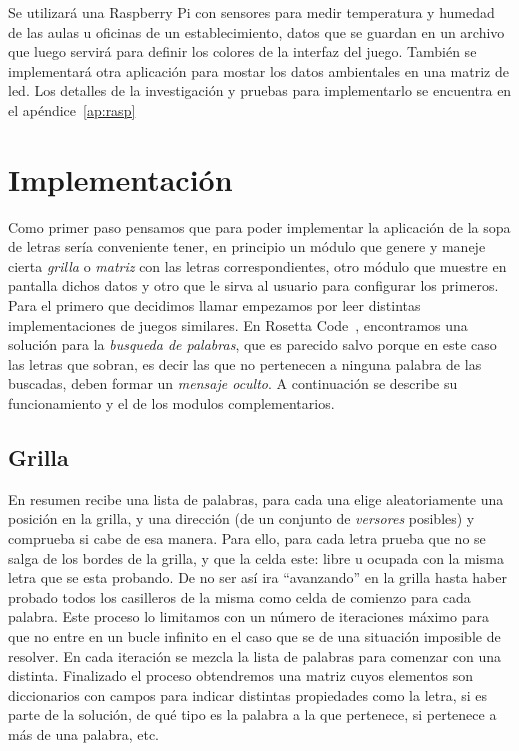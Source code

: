 Se utilizará una Raspberry Pi con sensores para medir temperatura y humedad de las aulas u oficinas de un establecimiento, datos que se guardan en un archivo que luego servirá para definir los colores de la interfaz del juego.
También se implementará otra aplicación para mostar los datos ambientales en una matriz de led. Los detalles de la investigación y pruebas para implementarlo se encuentra en el apéndice~\ref{ap:rasp}

\chapter{Implementación}

Como primer paso pensamos que para poder implementar la aplicación de la sopa de letras sería conveniente tener, en principio un módulo que genere y maneje cierta \emph{grilla} o \emph{matriz} con las letras correspondientes, otro módulo que muestre en pantalla dichos datos y otro que le sirva al usuario para configurar los primeros.
Para el primero que decidimos llamar  empezamos por leer distintas implementaciones de juegos similares. En Rosetta Code~\autocite{rosetta}, encontramos una solución para la \emph{busqueda de palabras}, que es parecido salvo porque en este caso las letras que sobran, es decir las que no pertenecen a ninguna palabra de las buscadas, deben formar un \emph{mensaje oculto}. A continuación se describe su funcionamiento y el de los modulos complementarios.

\section{Grilla}\label{grilla}

En resumen recibe una lista de palabras, para cada una elige aleatoriamente una posición en la grilla, y una dirección (de un conjunto de \emph{versores} posibles) y comprueba si cabe de esa manera. Para ello, para cada letra prueba que no se salga de los bordes de la grilla, y que la celda este: libre u ocupada con la misma letra que se esta probando. De no ser así ira ``avanzando'' en la grilla hasta haber probado todos los casilleros de la misma como celda de comienzo para cada palabra. Este proceso lo limitamos con un número de iteraciones máximo para que no entre en un bucle infinito en el caso que se de una situación imposible de resolver. En cada iteración se mezcla la lista de palabras para comenzar con una distinta.
Finalizado el proceso obtendremos una matriz cuyos elementos son diccionarios con campos para indicar distintas propiedades como la letra, si es parte de la solución, de qué tipo es la palabra a la que pertenece, si pertenece a más de una palabra, etc.


